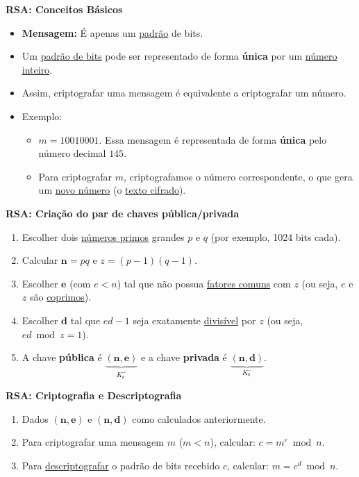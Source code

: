     \textbf{RSA: Conceitos Básicos}
    \begin{itemize}[left=0.5cm, align=left, nosep]    
        \item \textbf{Mensagem:} É apenas um \underline{padrão} de bits.
        \item Um \underline{padrão de bits} pode ser representado de forma \textbf{única} por um \underline{número inteiro}.
        \item Assim, criptografar uma mensagem é equivalente a criptografar um número.
        \item Exemplo: 
        \begin{itemize}[left=0.5cm, nosep, label=$\hookrightarrow$]
            \item $m = 10010001$. Essa mensagem é representada de forma \textbf{única} pelo número decimal $145$.
            \item Para criptografar $m$, criptografamos o número correspondente, o que gera um \underline{novo número} (o \underline{texto cifrado}).
        \end{itemize}
    \end{itemize}

    \textbf{RSA: Criação do par de chaves pública/privada}
    \begin{enumerate}[left=0.5cm, align=left, nosep]
        \item Escolher dois \underline{números primos} grandes $p$ e $q$ (por exemplo, 1024 bits cada).
        \item Calcular $\mathbf{n} = pq$ e $z = (p-1)(q-1)$.
        \item Escolher $\mathbf{e}$ (com $e < n$) tal que não possua \underline{fatores comuns} com $z$ (ou seja, $e$ e $z$ são \underline{coprimos}).
        \item Escolher $\mathbf{d}$ tal que $ed - 1$ seja exatamente \underline{divisível} por $z$ (ou seja, $ed \bmod z = 1$).
       \item A chave \textbf{pública} é $\underbrace{(\mathbf{n}, \mathbf{e})}_{K_b^+}$ e a chave \textbf{privada} é $\underbrace{(\mathbf{n}, \mathbf{d})}_{K_b^-}$.
    \end{enumerate}
    
    \textbf{RSA: Criptografia e Descriptografia}
    \begin{enumerate}[left=0.5cm, align=left, nosep]
        \item Dados $(\mathbf{n}, \mathbf{e})$ e $(\mathbf{n}, \mathbf{d})$ como calculados anteriormente.
        \item Para criptografar uma mensagem $m$ ($m < n$), calcular: $c = m^e \bmod n$.
        \item Para \underline{descriptografar} o padrão de bits recebido $c$, calcular: $m = c^d \bmod n$.
    \end{enumerate}

